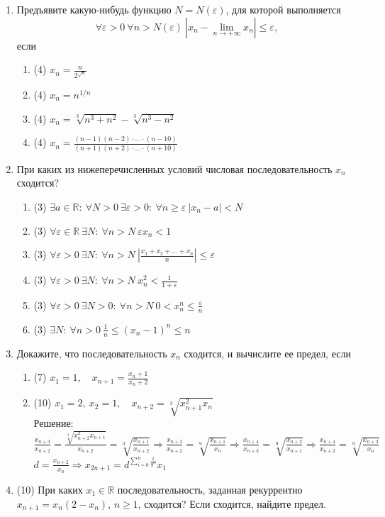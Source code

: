 \documentclass[a4paper]{article}
\def\eps{\varepsilon}
\begin{document}
\begin{enumerate}
    \item Предъявите какую-нибудь функцию $N = N(\eps)$, для которой выполняется
    \[
        \forall \eps>0\ \forall n> N(\eps)\ |x_n-\lim\limits_{n\to+\infty} x_n|\leq \eps,
    \]
    если
    \begin{multicols}{2}
    \begin{enumerate}
        \item (4) $x_n = \frac{n}{2^{\sqrt{n}}}$
        \item (4) $x_n = n^{1/n}$
        \item (4) $x_n = \sqrt[3]{n^3 + n^2} - \sqrt[3]{n^3 - n^2}$
        \item (4) $x_n = \frac{(n-1)(n-2)\cdot\dots\cdot (n-10)}{(n+1)(n+2)\cdot\dots\cdot(n+10)}$
    \end{enumerate}
    \end{multicols}
	
	\item При каких из нижеперечисленных условий числовая последовательность $x_n$ сходится?
	\begin{enumerate}
	    \item (3) $\exists a\in \mathbb R:\ \forall N>0\ \exists \eps>0:\ \forall n\geq\eps\ |x_n - a|<N$
	    \item (3) $\forall \eps\in \mathbb R\ \exists N:\ \forall n>N\ \eps x_n < 1$
	    \item (3) $\forall \eps>0\ \exists N:\ \forall n>N\ \left|\frac{x_1+x_2+\dots + x_n}{n}\right|\leq \eps$
	    \item (3) $\forall \eps>0\ \exists N:\ \forall n>N\ x_n^2<\frac{1}{1+\eps}$
	    \item (3) $\forall\eps>0\ \exists N>0:\ \forall n>N\ 0<x_n^n\leq \frac{\eps}{n}$
	    \item (3) $\exists N:\ \forall n>0\ \frac{1}{n}\leq (x_n - 1)^n \leq n$
	\end{enumerate}
    
    \item Докажите, что последовательность $x_n$ сходится, и вычислите ее предел, если
    \begin{enumerate}
        \item (7) $x_1=1,\quad x_{n+1}=\frac{x_n + 1}{x_n + 2}$
        \item (10) $x_1 = 2,\ x_2 = 1,\quad x_{n+2} = \sqrt[3]{x_{n+1}^2x_n}$\\
        Решение:\\
        $\frac{x_{n+3}}{x_{n+2}}=\frac{\sqrt[3]{x_{n+2}^2x_{n+1}}}{x_{n+2}}=\sqrt[3]{\frac{x_{n+1}}{x_{n+2}}} \Rightarrow \frac{x_{n+3}}{x_{n+2}} = \sqrt[9]{\frac{x_{n+1}}{x_n}} \Rightarrow \frac{x_{n+4}}{x_{n+3}} = \sqrt[9]{\frac{x_{n+2}}{x_{n+1}}} \Rightarrow \frac{x_{n+4}}{x_{n+2}} = \sqrt[9]{\frac{x_{n+2}}{x_{n}}}$\\
        $d = \frac{x_{n+2}}{x_{n}} \Rightarrow x_{2n+1} = d^{\sum_{i=0}^n\frac{1}{9^n}}x_1$
    \end{enumerate}
    
    \item (10) При каких $x_1\in\mathbb{R}$ последовательность, заданная рекуррентно $x_{n+1}=x_n(2-x_n)$, $n\geqslant1$, сходится? Если сходится, найдите предел.
\end{enumerate}
\end{document}
